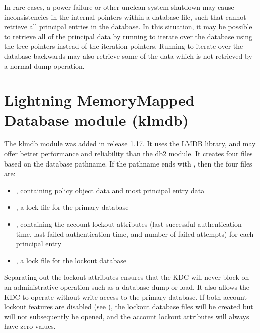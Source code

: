 \documentclass[letterpaper,10pt,english]{sphinxmanual}
\begin{document}
\sphinxAtStartPar
In rare cases, a power failure or other unclean system shutdown may
cause inconsistencies in the internal pointers within a database file,
such that  cannot retrieve all principal entries in
the database.  In this situation, it may be possible to retrieve all
of the principal data by running  to
iterate over the database using the tree pointers instead of the
iteration pointers.  Running  to iterate over
the database backwards may also retrieve some of the data which is not
retrieved by a normal dump operation.


\section{Lightning Memory\sphinxhyphen{}Mapped Database module (klmdb)}
\label{\detokenize{admin/dbtypes:lightning-memory-mapped-database-module-klmdb}}
\sphinxAtStartPar
The klmdb module was added in release 1.17.  It uses the LMDB library,
and may offer better performance and reliability than the db2 module.
It creates four files based on the database pathname.  If the pathname
ends with , then the four files are:
\begin{itemize}
\item {} 
\sphinxAtStartPar
{}, containing policy object data and most principal
entry data

\item {} 
\sphinxAtStartPar
{}, a lock file for the primary database

\item {} 
\sphinxAtStartPar
{}, containing the account lockout attributes
(last successful authentication time, last failed authentication
time, and number of failed attempts) for each principal entry

\item {} 
\sphinxAtStartPar
{}, a lock file for the lockout database

\end{itemize}

\sphinxAtStartPar
Separating out the lockout attributes ensures that the KDC will never
block on an administrative operation such as a database dump or load.
It also allows the KDC to operate without write access to the primary
database.  If both account lockout features are disabled (see
{\hyperref[\detokenize{admin/lockout:disable-lockout}]{}}), the lockout database files will be created
but will not subsequently be opened, and the account lockout
attributes will always have zero values.
\end{document}
